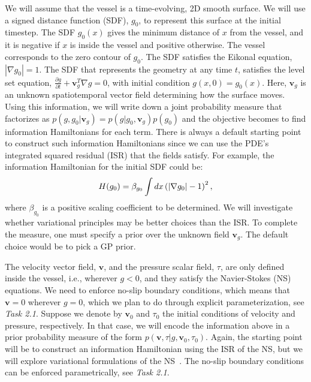 We will assume that the vessel is a time-evolving, 2D smooth surface.
We will use a signed distance function (SDF), $g_0$, to represent this surface at the initial timestep.
The SDF $g_0(x)$ gives the minimum distance of $x$ from the vessel, and it is negative if $x$ is inside the vessel and positive otherwise.
The vessel corresponds to the zero contour of $g_0$.
The SDF satisfies the Eikonal equation, $|\nabla g_0| = 1$.
The SDF that represents the geometry at any time $t$, satisfies the level set equation, $\frac{\partial g}{\partial t} + \mathbf{v}_g^T\nabla g = 0$, with initial condition $g(x,0) = g_0(x)$.
Here, $\mathbf{v}_g$ is an unknown spatiotemporal vector field determining how the surface moves.
Using this information, we will write down a joint probability measure that factorizes as $p(g, g_0|\mathbf{v}_g) = p(g|g_0, \mathbf{v}_g) p(g_0)$ and the objective becomes to find information Hamiltonians for each term.
There is always a default starting point to construct such information Hamiltonians since we can use the PDE's integrated squared residual (ISR) that the fields satisfy.
For example, the information Hamiltonian for the initial SDF could be:
$$
\small
H(g_0) = \beta_{g_0}\int dx \left(|\nabla g_0| - 1\right)^2,
$$
where $\beta_{g_0}$ is a positive scaling coefficient to be determined.
We will investigate whether variational principles may be better choices than the ISR.
To complete the measure, one must specify a prior over the unknown field $\mathbf{v}_g$.
The default choice would be to pick a GP prior.

The velocity vector field, $\mathbf{v}$, and the pressure scalar field, $\tau$, are only defined inside the vessel, i.e., wherever $g < 0$, and they satisfy the Navier-Stokes (NS) equations.
We need to enforce no-slip boundary conditions, which means that $\mathbf{v} = 0$ wherever $g=0$, which we plan to do through explicit parameterization, see \emph{Task 2.1}.
Suppose we denote by $\mathbf{v}_0$ and $\tau_0$ the initial conditions of velocity and pressure, respectively. In that case, we will encode the information above in a prior probability measure of the form $p(\mathbf{v}, \tau|g, \mathbf{v}_0, \tau_0)$.
Again, the starting point will be to construct an information Hamiltonian using the ISR of the NS, but we will explore variational formulations of the NS~\cite{finlayson1972existence, vecile1984extended, bramble1994variational, manouzi2005mixed, taha2023variational, bistafa2023lagrangians}.
The no-slip boundary conditions can be enforced parametrically, see \emph{Task 2.1}.

